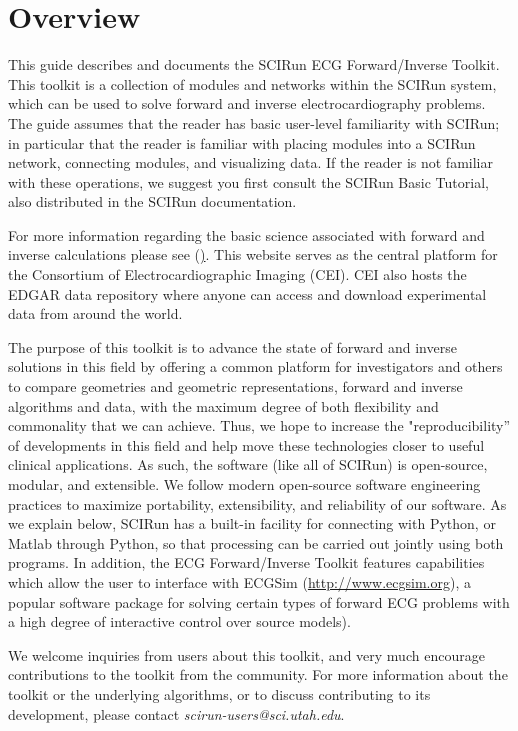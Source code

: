 \chapter{Overview}

\begin{introduction}

This guide describes and documents the SCIRun ECG Forward/Inverse
Toolkit. This toolkit is a collection of modules and networks
within the SCIRun system, which can be used to solve forward and inverse
electrocardiography problems. The guide assumes that the reader has basic
user-level familiarity with SCIRun; in particular that the reader is
familiar with placing modules into a SCIRun network, connecting modules,
and visualizing data. If the reader is not familiar with these operations,
we suggest you first consult the SCIRun Basic Tutorial, also distributed in
the SCIRun documentation.

For more information regarding the basic science associated with forward and inverse calculations please see (\href{ecg-imaging.org}). This website serves as the central platform for the Consortium of Electrocardiographic Imaging (CEI). CEI also hosts the EDGAR data repository where anyone can access and download experimental data from around the world. 

The purpose of this toolkit is to advance the state of forward and inverse
solutions in this field by offering a common platform for investigators and
others to compare geometries and geometric representations, forward and inverse algorithms and data, with the maximum degree of both flexibility
and commonality that we can achieve. Thus, we hope to increase the
"reproducibility'' of developments in this field and help
move these technologies closer to useful clinical applications. As such, the
software (like all of SCIRun) is open-source, modular, and extensible. We
follow modern open-source software engineering practices to maximize
portability, extensibility, and reliability of our software. As we explain below, SCIRun has a
built-in facility for connecting with Python, or Matlab through Python, so that processing can be
carried out jointly using both programs. In
addition, the ECG Forward/Inverse Toolkit features capabilities which allow
the user to interface with ECGSim (\href{http://www.ecgsim.org}{http://www.ecgsim.org}), a
popular software package for solving certain types of forward ECG problems
with a high degree of interactive control over source models).

We welcome inquiries from users about this toolkit, and very much encourage
contributions to the toolkit from the community. For more information
about the toolkit or the underlying algorithms, or to discuss contributing to
its development, please contact \textit{scirun-users@sci.utah.edu}.


\end{introduction}
